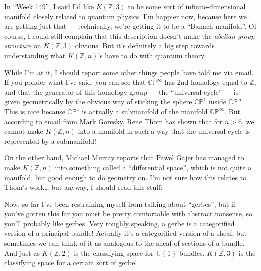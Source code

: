 \documentclass{article}
\renewcommand{\texttt}[1]{%
  \begingroup
  \ttfamily
  \begingroup\lccode`~=`/\lowercase{\endgroup\def~}{/\discretionary{}{}{}}%
  \begingroup\lccode`~=`[\lowercase{\endgroup\def~}{[\discretionary{}{}{}}%
  \begingroup\lccode`~=`.\lowercase{\endgroup\def~}{.\discretionary{}{}{}}%
  \catcode`/=\active\catcode`[=\active\catcode`.=\active
  \scantokens{#1\noexpand}%
  \endgroup
}
\begin{document}
In \protect\hyperlink{week149}{``Week 149''}, I said I'd like
\(K(\mathbb{Z},3)\) to be some sort of infinite-dimensional manifold
closely related to quantum physics. I'm happier now, because here we are
getting just that --- technically, we're getting it to be a ``Banach
manifold''. Of course, I could still complain that this description
doesn't make the \emph{abelian group structure} on \(K(\mathbb{Z},3)\)
obvious. But it's definitely a big step towards understanding what
\(K(\mathbb{Z},n)\)'s have to do with quantum theory.

While I'm at it, I should report some other things people have told me
via email. If you ponder what I've said, you can see that
\(\mathbb{CP}^\infty\) has 2nd homology equal to \(\mathbb{Z}\), and
that the generator of this homology group --- the ``universal cycle''
--- is given geometrically by the obvious way of sticking the sphere
\(\mathbb{CP}^1\) inside \(\mathbb{CP}^\infty\). This is nice because
\(\mathbb{CP}^1\) is actually a submanifold of the manifold
\(\mathbb{CP}^\infty\). But according to email from Mark Goresky, Rene
Thom has shown that for \(n > 6\), we cannot make \(K(\mathbb{Z},n)\)
into a manifold in such a way that the universal cycle is represented by
a submanifold!

On the other hand, Michael Murray reports that Pawel Gajer has managed
to make \(K(\mathbb{Z},n)\) into something called a ``differential
space'', which is not quite a manifold, but good enough to do geometry
on. I'm not sure how this relates to Thom's work\ldots{} but anyway, I
should read this stuff:


Now, so far I've been restraining myself from talking about ``gerbes'',
but if you've gotten this far you must be pretty comfortable with
abstract nonsense, so you'll probably like gerbes. Very roughly
speaking, a gerbe is a categorified version of a principal bundle!
Actually it's a categorified version of a sheaf, but sometimes we can
think of it as analogous to the sheaf of sections of a bundle. And just
as \(K(\mathbb{Z},2)\) is the classifying space for \(\mathrm{U}(1)\)
bundles, \(K(\mathbb{Z},3)\) is the classifying space for a certain sort
of gerbe!
\end{document}
